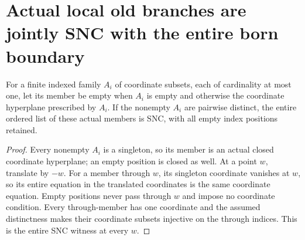 \section{Actual local old branches are jointly SNC with the entire born boundary}
\label{sec:nc-joint-branch-charts}

\begin{lemma}
\label{hir:nc-indexed-coordinate-family-empty-positions-snc}
\leanok
For a finite indexed family $A_i$ of coordinate subsets, each of cardinality
at most one, let its member be empty when $A_i$ is empty and otherwise the
coordinate hyperplane prescribed by $A_i$. If the nonempty $A_i$ are pairwise
distinct, the entire ordered list of these actual members is SNC, with all
empty index positions retained.
\end{lemma}
\begin{proof}
Every nonempty $A_i$ is a singleton, so its member is an actual closed
coordinate hyperplane; an empty position is closed as well. At a point $w$,
translate by $-w$. For a member through $w$, its singleton coordinate vanishes
at $w$, so its entire equation in the translated coordinates is the same
coordinate equation. Empty positions never pass through $w$ and impose no
coordinate condition. Every through-member has one coordinate and the
assumed distinctness makes their coordinate subsets injective on the through
indices. This is the entire SNC witness at every $w$.
\end{proof}

